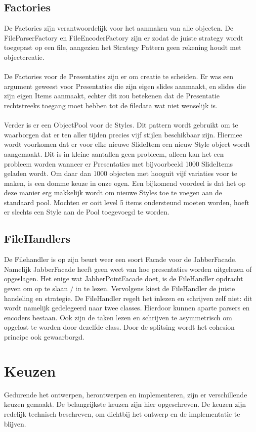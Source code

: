 \documentclass[a4paper]{article}
\newcommand{\1}[0]{\'{e}\'{e}n}
\begin{document}
\subsection{Factories}
\label{sub:factories}
De Factories zijn verantwoordelijk voor het aanmaken van alle objecten. De
FileParserFactory en FileEncoderFactory zijn er zodat de juiste strategy wordt
toegepast op een file, aangezien het Strategy Pattern geen rekening houdt met
objectcreatie.
\\\\
De Factories voor de Presentaties zijn er om creatie te scheiden. Er was een
argument geweest voor Presentaties die zijn eigen slides aanmaakt, en slides
die zijn eigen Items aanmaakt, echter dit zou betekenen dat de Presentatie
rechtstreeks toegang moet hebben tot de filedata wat niet wenselijk is.
\\\\
Verder is er een ObjectPool voor de Styles. Dit pattern wordt gebruikt om te
waarborgen dat er ten aller tijden precies vijf stijlen beschikbaar zijn. Hiermee wordt voorkomen dat er voor elke nieuwe SlideItem een nieuw Style object wordt aangemaakt. Dit is in kleine aantallen geen probleem, alleen kan het een probleem worden wanneer er Presentaties met bijvoorbeeld 1000 SlideItems geladen wordt. Om daar dan 1000 objecten met hooguit vijf variaties voor te maken, is een domme keuze in onze ogen. Een bijkomend voordeel is dat het op deze manier erg makkelijk wordt om nieuwe Styles toe te voegen aan de standaard pool. Mochten er ooit level 5 items ondersteund moeten worden, hoeft er slechts een Style aan de Pool toegevoegd te worden.

\subsection{FileHandlers}
De Filehandler is op zijn beurt weer een soort Facade voor de JabberFacade.
Namelijk JabberFacade heeft geen weet van hoe presentaties worden uitgelezen of
opgeslagen. Het enige wat JabberPointFacade doet, is de FileHandler opdracht geven om op te slaan / in te lezen. Vervolgens kiest de FileHandler de juiste handeling en strategie. De FileHandler regelt het inlezen en schrijven zelf niet: dit wordt namelijk gedelegeerd naar twee classes. Hierdoor kunnen aparte parsers en encoders bestaan. Ook zijn de taken lezen en schrijven te asymmetrisch om opgelost te worden door dezelfde class. Door de splitsing wordt het cohesion principe ook gewaarborgd.

\section{Keuzen}
\label{sec:keuzen}
Gedurende het ontwerpen, herontwerpen en implementeren, zijn er verschillende keuzen gemaakt. De belangrijkste keuzen zijn hier opgeschreven. De keuzen zijn redelijk technisch beschreven, om dichtbij het ontwerp en de implementatie te blijven.
\end{document}
